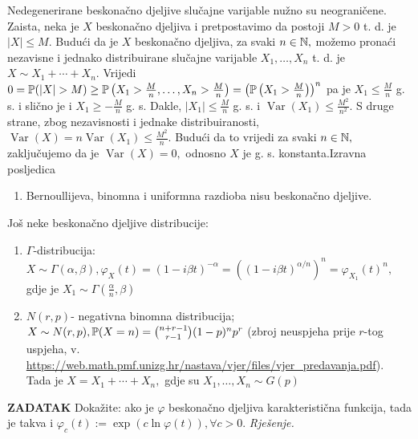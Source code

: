 \documentclass{article}
\newcommand{\Var}{\operatorname{Var}}
\begin{document}
Nedegenerirane beskonačno djeljive slučajne varijable nužno su neograničene. Zaista, neka je \(X\) beskonačno djeljiva i pretpostavimo da postoji \(M>0\) t. d. je \(|X|\le M.\) Budući da je \(X\) beskonačno djeljiva, za svaki \(n\in\Bbb N,\) možemo pronaći  nezavisne i jednako distribuirane slučajne varijable \(X_1,\ldots,X_n\) t. d. je \(X\sim X_1+\cdots+X_n.\) Vrijedi \(0=\Bbb P(|X|>M)\ge\Bbb P\left(X_1>\frac{M}n,\ldots,X_n>\frac{M}n\right)=\left(\Bbb P\left(X_1>\frac{M}n\right)\right)^n\) pa je \(X_1\le\frac{M}n\) g. s. i slično je i \(X_1\ge-\frac{M}n\) g. s. Dakle, \(|X_1|\le\frac{M}n\) g. s. i \(\Var(X_1)\le\frac{M^2}{n^2}.\) S druge strane, zbog nezavisnosti i jednake distribuiranosti, \(\Var(X)=n\Var(X_1)\le\frac{M^2}n.\) Budući da to vrijedi za svaki \(n\in\Bbb N,\) zaključujemo da je \(\Var(X)=0,\) odnosno \(X\) je g. s. konstanta.\newline\newline Izravna posljedica\begin{enumerate}
    \item[\ding{113}] Bernoullijeva, binomna i uniformna razdioba nisu beskonačno djeljive.  
\end{enumerate}
Još neke beskonačno djeljive distribucije:\begin{enumerate}
    \item[\ding{113}] \(\Gamma\)-distribucija: \(X\sim\Gamma(\alpha,\beta),\varphi_X(t)=(1-i\beta t)^{-\alpha}=\left((1-i\beta t)^{\alpha/n}\right)^n=\varphi_{X_1}(t)^n,\) gdje je \(X_1\sim\Gamma\left(\frac\alpha{n},\beta\right)\)
    \item[\ding{113}] \(N(r,p)\)- negativna binomna distribucija; \(X\sim N(r,p),\Bbb P(X=n)=\binom{n+r-1}{r-1}(1-p)^np^r\) (zbroj neuspjeha prije \(r\)-tog uspjeha, v. \url{https://web.math.pmf.unizg.hr/nastava/vjer/files/vjer_predavanja.pdf}). Tada je \(X=X_1+\cdots+X_n,\) gdje su \(X_1,\ldots,X_n\sim G(p)\)
\end{enumerate}
\textbf{ZADATAK}\newline
Dokažite: ako je \(\varphi\) beskonačno djeljiva karakteristična funkcija, tada je takva i \(\varphi_c(t):=\exp\left(c\ln\varphi(t)\right),\forall c>0.\)\newline\newline
\textit{Rješenje.}\newline
\end{document}
